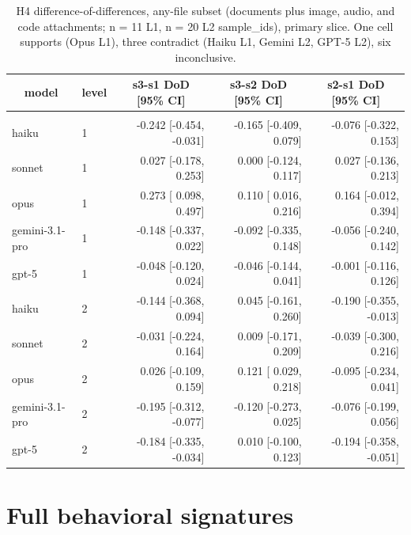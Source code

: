 \documentclass[10pt]{article} %
\begin{document}
    \begin{table}[h]
        \caption{H4 difference-of-differences, any-file subset (documents plus image, audio, and code attachments; n = 11 L1, n = 20 L2 sample\_ids), primary slice. One cell supports (Opus L1), three contradict (Haiku L1, Gemini L2, GPT-5 L2), six inconclusive.}
    \label{tab:h4_anyfile}
    \begin{center}
    \small
    \begin{tabular}{llrrr}
        \multicolumn{1}{c}{\bf model} & \multicolumn{1}{c}{\bf level} & \multicolumn{1}{c}{\bf s3-s1 DoD [95\% CI]} & \multicolumn{1}{c}{\bf s3-s2 DoD [95\% CI]} & \multicolumn{1}{c}{\bf s2-s1 DoD [95\% CI]} \\
        \hline \\
        haiku          & 1 & -0.242 [-0.454, -0.031] & -0.165 [-0.409,  0.079] & -0.076 [-0.322,  0.153] \\
        sonnet         & 1 &  0.027 [-0.178,  0.253] &  0.000 [-0.124,  0.117] &  0.027 [-0.136,  0.213] \\
        opus           & 1 &  0.273 [ 0.098,  0.497] &  0.110 [ 0.016,  0.216] &  0.164 [-0.012,  0.394] \\
        gemini-3.1-pro & 1 & -0.148 [-0.337,  0.022] & -0.092 [-0.335,  0.148] & -0.056 [-0.240,  0.142] \\
        gpt-5          & 1 & -0.048 [-0.120,  0.024] & -0.046 [-0.144,  0.041] & -0.001 [-0.116,  0.126] \\
        haiku          & 2 & -0.144 [-0.368,  0.094] &  0.045 [-0.161,  0.260] & -0.190 [-0.355, -0.013] \\
        sonnet         & 2 & -0.031 [-0.224,  0.164] &  0.009 [-0.171,  0.209] & -0.039 [-0.300,  0.216] \\
        opus           & 2 &  0.026 [-0.109,  0.159] &  0.121 [ 0.029,  0.218] & -0.095 [-0.234,  0.041] \\
        gemini-3.1-pro & 2 & -0.195 [-0.312, -0.077] & -0.120 [-0.273,  0.025] & -0.076 [-0.199,  0.056] \\
        gpt-5          & 2 & -0.184 [-0.335, -0.034] &  0.010 [-0.100,  0.123] & -0.194 [-0.358, -0.051] \\
    \end{tabular}
    \end{center}
    \end{table}


\section{Full behavioral signatures}\label{app:rq3_behavioral_full}
\end{document}
